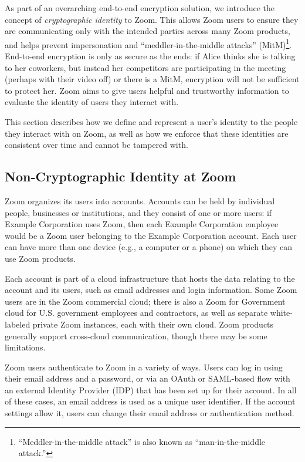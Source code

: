 \label{sec:identitykeymanagement}
As part of an overarching end-to-end encryption solution, we introduce the concept of
\textit{cryptographic identity} to Zoom. This allows Zoom users to ensure they are communicating
only with the intended parties across many Zoom products, and helps prevent impersonation and
``meddler-in-the-middle attacks'' (MitM)\footnote{``Meddler-in-the-middle attack'' is also known as
``man-in-the-middle attack.''}. End-to-end encryption is only as secure as the ends: if Alice thinks
she is talking to her coworkers, but instead her competitors are participating in the meeting
(perhaps with their video off) or there is a MitM, encryption will not be
sufficient to protect her. Zoom aims to give users helpful and trustworthy information to evaluate
the identity of users they interact with.

This section describes how we define and represent a user's identity to the people they interact
with on Zoom, as well as how we enforce that these identities are consistent over time and cannot be
tampered with.

\subsection{Non-Cryptographic Identity at Zoom}

Zoom organizes its users into accounts. Accounts can be held by individual people, businesses or
institutions, and they consist of one or more users: if Example Corporation uses Zoom, then each
Example Corporation employee would be a Zoom user belonging to the Example Corporation account. Each
user can have more than one device (e.g., a computer or a phone) on which they can use Zoom
products.

Each account is part of a cloud infrastructure that hosts the data relating to the account and its
users, such as email addresses and login information. Some Zoom users are in the Zoom commercial
cloud; there is also a Zoom for Government cloud for U.S. government employees and contractors, as
well as separate white-labeled private Zoom instances, each with their own cloud. Zoom products
generally support cross-cloud communication, though there may be some limitations.

Zoom users authenticate to Zoom in a variety of ways. Users can log in using their email address and
a password, or via an OAuth or SAML-based flow with an external Identity Provider (IDP) that has
been set up for their account. In all of these cases, an email address is used as a unique user
identifier. If the account settings allow it, users can change their email address or authentication
method.

